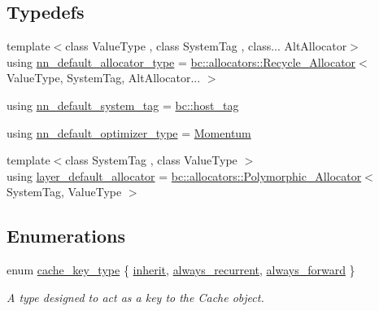 \subsection*{Typedefs}
\begin{DoxyCompactItemize}
\item 
{\footnotesize template$<$class Value\+Type , class System\+Tag , class... Alt\+Allocator$>$ }\\using \hyperlink{namespacebc_1_1nn_a0025752fc3f47f988b3fae106c825860}{nn\+\_\+default\+\_\+allocator\+\_\+type} = \hyperlink{structbc_1_1allocators_1_1Recycle__Allocator}{bc\+::allocators\+::\+Recycle\+\_\+\+Allocator}$<$ Value\+Type, System\+Tag, Alt\+Allocator... $>$
\item 
using \hyperlink{namespacebc_1_1nn_a17bbb7ff945016ee40da7ebbd272f4a2}{nn\+\_\+default\+\_\+system\+\_\+tag} = \hyperlink{structbc_1_1host__tag}{bc\+::host\+\_\+tag}
\item 
using \hyperlink{namespacebc_1_1nn_ad8fbb567f69851a9636db98901712535}{nn\+\_\+default\+\_\+optimizer\+\_\+type} = \hyperlink{structbc_1_1nn_1_1Momentum}{Momentum}
\item 
{\footnotesize template$<$class System\+Tag , class Value\+Type $>$ }\\using \hyperlink{namespacebc_1_1nn_ada5847e5a4ac1bbdcc0b8dbcfcbf320e}{layer\+\_\+default\+\_\+allocator} = \hyperlink{structbc_1_1allocators_1_1Polymorphic__Allocator}{bc\+::allocators\+::\+Polymorphic\+\_\+\+Allocator}$<$ System\+Tag, Value\+Type $>$
\end{DoxyCompactItemize}
\subsection*{Enumerations}
\begin{DoxyCompactItemize}
\item 
enum \hyperlink{namespacebc_1_1nn_a6973f1eb052448a0a62bae16c2ffd227}{cache\+\_\+key\+\_\+type} \{ \hyperlink{namespacebc_1_1nn_a6973f1eb052448a0a62bae16c2ffd227adb9556ae635e4b90a32cd0e2d4b623f5}{inherit}, 
\hyperlink{namespacebc_1_1nn_a6973f1eb052448a0a62bae16c2ffd227a696a94358808d670d9d9bbbd1b395dea}{always\+\_\+recurrent}, 
\hyperlink{namespacebc_1_1nn_a6973f1eb052448a0a62bae16c2ffd227ab21e4901079ed9d29f7a4b39e470d795}{always\+\_\+forward}
 \}\begin{DoxyCompactList}\small\item\em A type designed to act as a key to the Cache object. \end{DoxyCompactList}
\end{DoxyCompactItemize}
